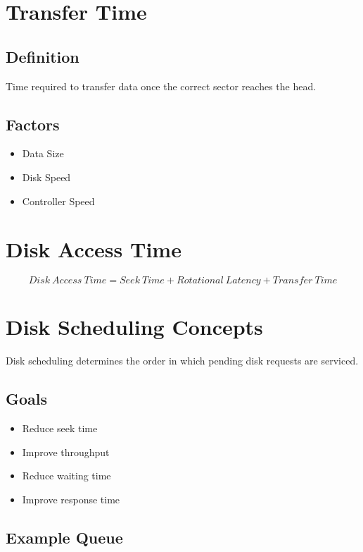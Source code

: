 \section{Transfer Time}

\subsection{Definition}

Time required to transfer data once the correct sector reaches the head.

\subsection{Factors}

\begin{itemize}
\item Data Size
\item Disk Speed
\item Controller Speed
\end{itemize}

\section{Disk Access Time}

\[
Disk\ Access\ Time=
Seek\ Time+
Rotational\ Latency+
Transfer\ Time
\]

\section{Disk Scheduling Concepts}

Disk scheduling determines the order in which pending disk requests are serviced.

\subsection{Goals}

\begin{itemize}
\item Reduce seek time
\item Improve throughput
\item Reduce waiting time
\item Improve response time
\end{itemize}

\subsection{Example Queue}

